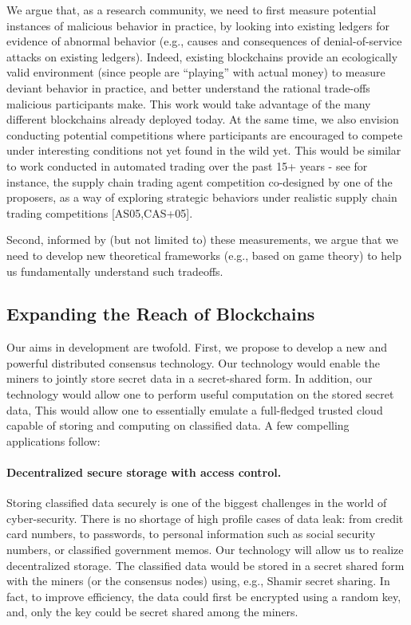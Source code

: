 \documentclass[runningheads, 12pt]{article}
\begin{document}
We argue that, as a research community, we need to first measure potential instances of malicious behavior in practice, by looking into existing ledgers for evidence of abnormal behavior (e.g., causes and consequences of denial-of-service attacks on existing ledgers). Indeed, existing blockchains provide an ecologically valid environment (since people are “playing” with actual money) to measure deviant behavior in practice, and better understand the rational trade-offs malicious participants make. This work would take advantage of the many different blockchains already deployed today. At the same time, we also envision conducting potential competitions where participants are encouraged to compete under interesting conditions not yet found in the wild yet. This would be similar to work conducted in automated trading over the past 15+ years - see for instance, the supply chain trading agent competition co-designed by one of the proposers, as a way of exploring strategic behaviors under realistic supply chain trading competitions [AS05,CAS+05].

Second, informed by (but not limited to) these measurements, we argue that we need to develop new theoretical frameworks (e.g., based on game theory) to help us fundamentally understand such tradeoffs.

\vspace{-4pt}
\subsection{Expanding the Reach of Blockchains}
\vspace{-3pt}

Our aims in development are twofold. First, we propose to develop a new and powerful distributed consensus technology. Our technology would enable the miners to jointly store secret data in a secret-shared form.  In addition, our technology would allow one to perform useful computation on the stored secret data, This would allow one to essentially emulate a full-fledged trusted cloud capable of storing and computing on classified data. A few compelling applications follow:

\vspace{-5pt}
\paragraph{Decentralized secure storage with access control.} Storing classified data securely is one of the biggest challenges in the world of cyber-security. There is no shortage of high profile cases of data leak: from credit card numbers, to passwords, to personal information such as social security numbers, or classified government memos. Our technology will allow us to realize decentralized storage. The classified data would be stored in a secret shared form with the miners (or the consensus nodes) using, e.g., Shamir secret sharing. In fact, to improve efficiency, the data could first be encrypted using a random key, and, only the key could be secret shared among the miners.
\end{document}
